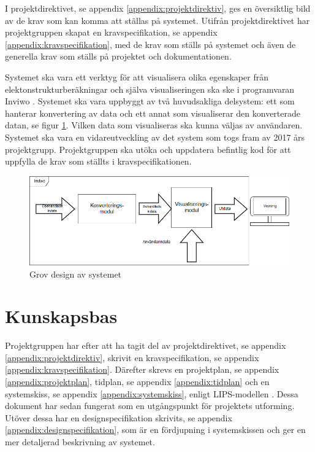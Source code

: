 \documentclass[a4paper,12pt]{article}
\begin{document}
I projektdirektivet, se appendix \ref{appendix:projektdirektiv}, ges en översiktlig bild av de krav som kan komma att ställas på systemet. Utifrån projektdirektivet har projektgruppen skapat en kravspecifikation, se appendix \ref{appendix:kravspecifikation}, med de krav som ställs på systemet och även de generella krav som ställs på projektet och dokumentationen.

Systemet ska vara ett verktyg för att visualisera olika egenskaper från elektonstrukturberäkningar och själva visualiseringen ska ske i programvaran Inviwo \cite{Inviwo}.
Systemet ska vara uppbyggt av två huvudsakliga delsystem: ett som hanterar konvertering av data och ett annat som visualiserar den konverterade datan, se figur \ref{fig:grov-skiss}. Vilken data som visualiseras ska kunna väljas av användaren. Systemet ska vara en vidareutveckling av det system som togs fram av 2017 års projektgrupp. Projektgruppen ska utöka och uppdatera befintlig kod för att uppfylla de krav som ställts i kravspecifikationen.

\begin{figure}[H]
	\centering
	\includegraphics[scale=0.55]{grov-skiss.png}
	\caption{Grov design av systemet}
	\label{fig:grov-skiss}
\end{figure}



\section{Kunskapsbas}
\label{ch:kunskapsbas}
Projektgruppen har efter att ha tagit del av projektdirektivet, se appendix \ref{appendix:projektdirektiv},
skrivit en kravspecifikation, se appendix \ref{appendix:kravspecifikation}. Därefter skrevs en projektplan, se appendix \ref{appendix:projektplan}, tidplan, se appendix \ref{appendix:tidplan} och en  systemskiss, se appendix \ref{appendix:systemskiss}, enligt LIPS-modellen \cite{LIPS}. 
Dessa dokument har sedan fungerat som en utgångspunkt för projektets utforming. Utöver dessa har en designspecifikation skrivits, se appendix \ref{appendix:designspecifikation}, som är en fördjupning i systemskissen och ger en mer detaljerad beskrivning av systemet.
\end{document}
